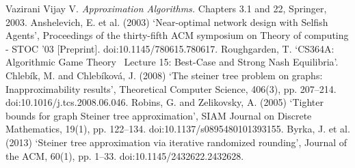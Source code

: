 \documentclass[11pt,psfig,times]{article}
\begin{document}
\begin{thebibliography}{10}
\setlength{\itemsep}{0pt plus .3pt}
\setlength{\parsep}{0pt plus .3pt}
\setlength{\parskip}{0pt plus .3pt}
Vazirani Vijay V. {\em Approximation Algorithms.\/} Chapters 3.1 and 22, Springer, 2003.
Anshelevich, E. et al. (2003) ‘Near-optimal network design with Selfish Agents’, Proceedings of the thirty-fifth ACM symposium on Theory of computing - STOC ’03 [Preprint]. doi:10.1145/780615.780617.
Roughgarden, T. ‘CS364A: Algorithmic Game Theory  Lecture 15: Best-Case and Strong Nash Equilibria’.
Chlebík, M. and Chlebíková, J. (2008) ‘The steiner tree problem on graphs: Inapproximability results’, Theoretical Computer Science, 406(3), pp. 207–214. doi:10.1016/j.tcs.2008.06.046. 
Robins, G. and Zelikovsky, A. (2005) ‘Tighter bounds for graph Steiner tree approximation’, SIAM Journal on Discrete Mathematics, 19(1), pp. 122–134. doi:10.1137/s0895480101393155. 
Byrka, J. et al. (2013) ‘Steiner tree approximation via iterative randomized rounding’, Journal of the ACM, 60(1), pp. 1–33. doi:10.1145/2432622.2432628.  
\end{thebibliography}
\end{document}
